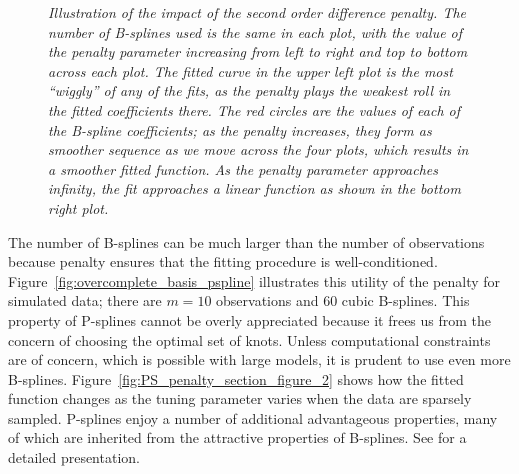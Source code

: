 \documentclass[12pt]{article}
\theoremstyle{definition}
\begin{document}
\begin{figure}[H]
\begin{subfigure}{.5\textwidth}
  \label{fig:pspline_small_lambda}
\end{subfigure}
\caption{\textit{Illustration of the impact of the second order difference penalty. The number of B-splines used is the same in each plot, with the value of the penalty parameter increasing from left to right and top to bottom across each plot. The fitted curve in the upper left plot is the most ``wiggly'' of any of the fits, as the penalty plays the weakest roll in the fitted coefficients there. The red circles are the values of each of the B-spline coefficients; as the penalty increases, they form as smoother sequence as we move across the four plots, which results in a smoother fitted function. As the penalty parameter approaches infinity, the fit approaches a linear function as shown in the bottom right plot.}}
\label{fig:second-ord-PS-pen-SML-lambda}
\end{figure}


The number of B-splines can be much larger than the number of observations because penalty ensures that the fitting procedure is well-conditioned. Figure~\ref{fig:overcomplete_basis_pspline} illustrates this utility of the penalty for simulated data; there are $m=10$ observations and $60$ cubic B-splines. This property of P-splines cannot be overly appreciated because it frees us from the concern of choosing the optimal set of knots. Unless computational constraints are of concern, which is possible with large models, it is prudent to use even more B-splines. Figure~\ref{fig:PS_penalty_section_figure_2} shows how the fitted function changes as the tuning parameter varies when the data are sparsely sampled. P-splines enjoy a number of additional advantageous properties, many of which are inherited from the attractive properties of B-splines. See \citet{eilers1996flexible}  for a detailed presentation. %
\end{document}
